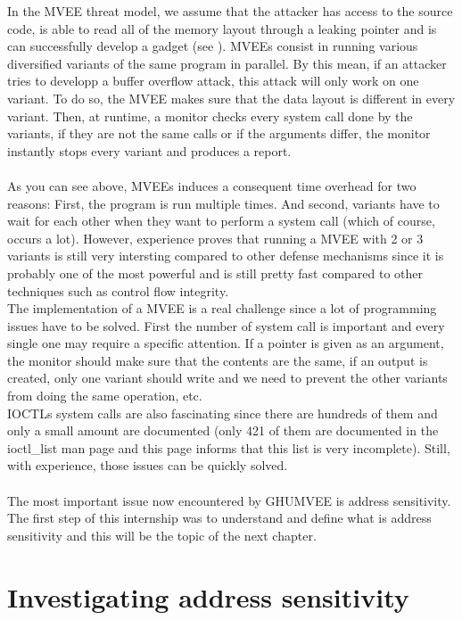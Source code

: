 \documentclass[english]{enstaPRE}
\begin{document}
In the MVEE threat model, we assume that the attacker has access to the source code, is able to read all of the memory layout through a leaking pointer and 
is can successfully develop a gadget (see ).
MVEEs consist in running various diversified variants of the same program in parallel. By this mean, if an attacker tries to developp
a buffer overflow attack, this attack will only work on one variant. To do so, the MVEE makes sure that the data layout is 
different in every variant. Then, at runtime, a monitor checks every system call done by the variants, if they are not the same
calls or if the arguments differ, the monitor instantly stops every variant and produces a report. \\
 \\
As you can see above, MVEEs induces a consequent time overhead for two reasons: First, the program is run multiple times. And second,
variants have to wait for each other when they want to perform a system call (which of course, occurs a lot).
However, experience proves that running a MVEE with 2 or 3 variants is still very intersting compared to other defense mechanisms 
since it is probably one of the most powerful and is still pretty fast compared to other techniques such as control flow integrity.
\\The implementation of a MVEE is a real challenge since a lot of programming issues have to be solved.
First the number of system call is important and every single one may require a specific attention. If a pointer is given as an argument,
the monitor should make sure that the contents are the same, if an output is created, only one variant should write and we need to 
prevent the other variants from doing the same operation, etc. \\ IOCTLs system calls are also fascinating since there are hundreds 
of them and only a small amount are documented (only 421 of them are documented in the ioctl\_list man page and this page informs 
that this list is very incomplete).  Still, with experience, those issues can be quickly solved.
\\ \\
The most important issue now encountered by GHUMVEE is address sensitivity. The first step of this internship was to understand and 
define what is address sensitivity and this will be the topic of the next chapter.

\chapter{Investigating address sensitivity}
\end{document}
